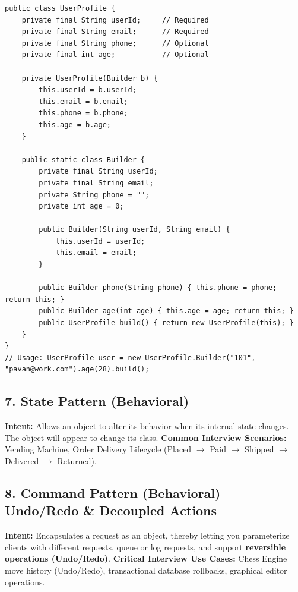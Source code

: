\documentclass[10pt,journal,compsoc,onecolumn]{IEEEtran}
\begin{document}
\begin{verbatim}
public class UserProfile {
    private final String userId;     // Required
    private final String email;      // Required
    private final String phone;      // Optional
    private final int age;           // Optional

    private UserProfile(Builder b) {
        this.userId = b.userId;
        this.email = b.email;
        this.phone = b.phone;
        this.age = b.age;
    }

    public static class Builder {
        private final String userId;
        private final String email;
        private String phone = "";
        private int age = 0;

        public Builder(String userId, String email) {
            this.userId = userId;
            this.email = email;
        }

        public Builder phone(String phone) { this.phone = phone; return this; }
        public Builder age(int age) { this.age = age; return this; }
        public UserProfile build() { return new UserProfile(this); }
    }
}
// Usage: UserProfile user = new UserProfile.Builder("101", "pavan@work.com").age(28).build();
\end{verbatim}

\subsection{7. State Pattern (Behavioral)}
\textbf{Intent:} Allows an object to alter its behavior when its internal state changes. The object will appear to change its class.
\textbf{Common Interview Scenarios:} Vending Machine, Order Delivery Lifecycle (Placed $\to$ Paid $\to$ Shipped $\to$ Delivered $\to$ Returned).

\subsection{8. Command Pattern (Behavioral) --- Undo/Redo \& Decoupled Actions}
\textbf{Intent:} Encapsulates a request as an object, thereby letting you parameterize clients with different requests, queue or log requests, and support \textbf{reversible operations (Undo/Redo)}.
\textbf{Critical Interview Use Cases:} Chess Engine move history (Undo/Redo), transactional database rollbacks, graphical editor operations.
\end{document}
